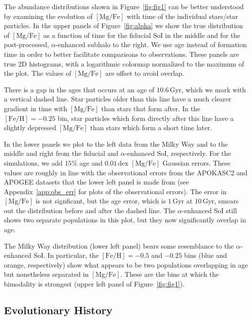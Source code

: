 \documentclass[linenumbers, twocolumn]{aastex631}
\newcommand{\Gyr}{\ensuremath{\textrm{Gyr}}}
\newcommand{\FeH}{\ensuremath{[\textrm{Fe}/\textrm{H}]}}
\newcommand{\MgFe}{\ensuremath{[\textrm{Mg}/\textrm{Fe}]}}
\newcommand{\dex}{\ensuremath{\textrm{dex}}}
\begin{document}
The abundance distributions shown in Figure~\ref{fig:fig1} can be better understood by examining the evolution of \MgFe{} with time of the individual stars/star particles. In the upper panels of Figure~\ref{fig:alpha} we show the true distribution of \MgFe{} as a function of time for the fiducial SoI in the middle and for the post-processed, $\alpha$-enhanced subhalo to the right. We use age instead of formation time in order to better facilitate comparisons to observations. These panels are true 2D histograms, with a logarithmic colormap normalized to the maximum of the plot. The values of \MgFe{} are offset to avoid overlap.

There is a gap in the ages that occurs at an age of $10.6\,\Gyr$, which we mark with a vertical dashed line. Star particles older than this line have a much clearer gradient in time with \MgFe{} than stars that form after. In the $\FeH=-0.25$ bin, star particles which form directly after this line have a slightly depressed \MgFe{} than stars which form a short time later.

In the lower panels we plot to the left data from the Milky Way and to the middle and right from the fiducial and $\alpha$-enhanced SoI, respectively. For the simulations, we add $15\%$ age and $0.01\,\dex$ \MgFe{} Gaussian errors. These values are roughly in line with the observational errors from the APOKASC2 and APOGEE datasets that the lower left panel is made from (see Appendix~\ref{app:obs_err} for plots of the observational errors). The error in \MgFe{} is not signficant, but the age error, which is $1\,\Gyr$ at $10\,\Gyr$, smears out the distribution before and after the dashed line. The $\alpha$-enhanced SoI still shows two separate populations in this plot, but they now significantly overlap in age.

The Milky Way distribution (lower left panel) bears some resemblance to the $\alpha$-enhanced SoI. In particular, the $\FeH=-0.5$ and $-0.25$ bins (blue and orange, respectively) show what appears to be two populations overlapping in age but nonetheless separated in \MgFe{}. These are the bins at which the bimodality is strongest (upper left panel of Figure~\ref{fig:fig1}).

\subsection{Evolutionary History}\label{ssec:evol}
\end{document}
